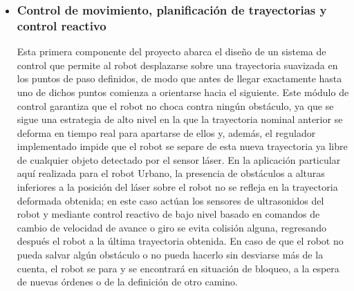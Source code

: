 \begin{itemize}
  \item \subsubsection{Control de movimiento, planificación de trayectorias y control reactivo}

  Esta primera componente del proyecto abarca el diseño de un sistema de control que permite al robot desplazarse sobre una trayectoria suavizada en los puntos de paso definidos, de modo que antes de llegar exactamente hasta uno de dichos puntos comienza a orientarse hacia el siguiente. Este módulo de control garantiza que el robot no choca contra ningún obstáculo, ya que se sigue una estrategia de alto nivel en la que la trayectoria nominal anterior se deforma en tiempo real para apartarse de ellos y, además, el regulador implementado impide que el robot se separe de esta nueva trayectoria ya libre de cualquier objeto detectado por el sensor láser. En la aplicación particular aquí realizada para el robot Urbano, la presencia de obstáculos a alturas inferiores a la posición del láser sobre el robot no se refleja en la trayectoria deformada obtenida; en este caso actúan los sensores de ultrasonidos del robot y mediante control reactivo de bajo nivel basado en comandos de cambio de velocidad de avance o giro se evita colisión alguna, regresando después el robot a la última trayectoria obtenida. En caso de que el robot no pueda salvar algún obstáculo o no pueda hacerlo sin desviarse más de la cuenta, el robot se para y se encontrará en situación de bloqueo, a la espera de nuevas órdenes o de la definición de otro camino.


\end{itemize}
